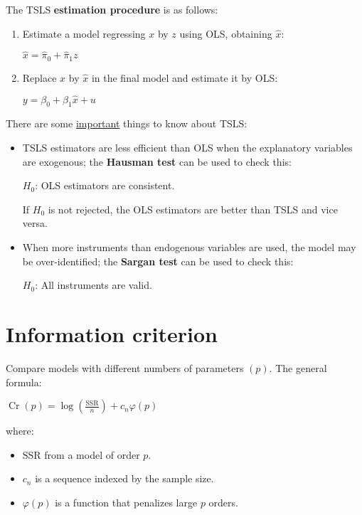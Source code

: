 \documentclass[10pt, a4paper, landscape]{article}
\DeclareMathOperator{\Cr}{Cr}
\newcommand{\SSR}{\text{SSR}}
\begin{document}
\begin{multicols}{3}
\begin{itemize}[leftmargin=*]
	The TSLS \textbf{estimation procedure} is as follows:
	\begin{enumerate}[leftmargin=*]
		\item Estimate a model regressing \( x \) by \( z \) using OLS, obtaining \( \hat{x} \):
		\begin{center}
			\( \hat{x} = \hat{\pi}_{0} + \hat{\pi}_{1} z \)
		\end{center}
		\item Replace \( x \) by \( \hat{x} \) in the final model and estimate it by OLS:
		\begin{center}
			\( y = \beta_{0} + \beta_{1} \hat{x}+ u \)
		\end{center}
	\end{enumerate}
	There are some \underline{important} things to know about TSLS:
	\begin{itemize}[leftmargin=*]
		\item TSLS estimators are less efficient than OLS when the explanatory variables are exogenous; the \textbf{Hausman test} can be used to check this:
		\begin{center}
			\( H_{0} \): OLS estimators are consistent.
		\end{center}
		If \( H_{0} \) is not rejected, the OLS estimators are better than TSLS and vice versa.
		\item When more instruments than endogenous variables are used, the model may be over-identified; the \textbf{Sargan test} can be used to check this:
		\begin{center}
			\( H_{0} \): All instruments are valid.
		\end{center}
	\end{itemize}
\end{itemize}

\columnbreak

\section*{Information criterion}

Compare models with different numbers of parameters \( (p) \). The general formula:

\begin{center}
	\( \Cr(p) = \log(\frac{\SSR}{n}) + c_{n} \varphi(p) \)
\end{center}

where:

\begin{itemize}[leftmargin=*]
	\item \( \SSR \) from a model of order \( p \).
	\item \( c_{n} \) is a sequence indexed by the sample size.
	\item \( \varphi(p) \) is a function that penalizes large \( p \) orders.
\end{itemize}


\end{multicols}
\end{document}
